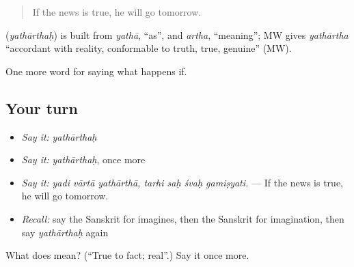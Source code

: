\begin{quote}
If the news is true, he will go tomorrow.
\end{quote}

\begin{cousinweb}
\textbf{} (\emph{yathārthaḥ}) is built from \emph{yathā}, \textquotedblleft{}as\textquotedblright{}, and \emph{artha}, \textquotedblleft{}meaning\textquotedblright{}; MW gives \emph{yathārtha} \textquotedblleft{}accordant with reality, conformable to truth, true, genuine\textquotedblright{} (MW).
\end{cousinweb}

\begin{grammarlens}[title={What you've built}]
One more word for saying what happens if.
\end{grammarlens}

\subsection*{Your turn}
\begin{itemize}
\raggedright
  \item \emph{Say it:} \emph{yathārthaḥ}
  \item \emph{Say it:} \emph{yathārthaḥ}, once more
  \item \emph{Say it:} \emph{yadi vārtā yathārthā, tarhi saḥ śvaḥ gamiṣyati.} — If the news is true, he will go tomorrow.
  \item \emph{Recall:} say the Sanskrit for imagines, then the Sanskrit for imagination, then say \emph{yathārthaḥ} again
\end{itemize}

\begin{tcolorbox}[breakable,colback=teal!4,colframe=teal!35!black,title={Before you move on}]
What does  mean? (\textquotedblleft{}True to fact; real\textquotedblright{}.) Say it once more.
\end{tcolorbox}
